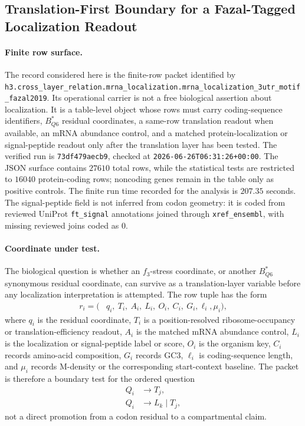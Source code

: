 \subsection{Translation-First Boundary for a Fazal-Tagged Localization Readout}\label{subsec:bioreality-q6-f3-stress-translation-first-localization}

\paragraph{Finite row surface.}
The record considered here is the finite-row packet identified by \texttt{h3.cross\_layer\_relation.mrna\_localization.mrna\_localization\_3utr\_motif\_fazal2019}.  Its operational carrier is not a free biological assertion about localization.  It is a table-level object whose rows must carry coding-sequence identifiers, $B^{*}_{Q6}$ residual coordinates, a same-row translation readout when available, an mRNA abundance control, and a matched protein-localization or signal-peptide readout only after the translation layer has been tested.  The verified run is \texttt{73df479aecb9}, checked at \texttt{2026-06-26T06:31:26+00:00}.  The JSON surface contains $27610$ total rows, while the statistical tests are restricted to $16040$ protein-coding rows; noncoding genes remain in the table only as positive controls.  The finite run time recorded for the analysis is $207.35$ seconds.  The signal-peptide field is not inferred from codon geometry: it is coded from reviewed UniProt \texttt{ft\_signal} annotations joined through \texttt{xref\_ensembl}, with missing reviewed joins coded as $0$.

\paragraph{Coordinate under test.}
The biological question is whether an $f_3$-stress coordinate, or another $B^{*}_{Q6}$ synonymous residual coordinate, can survive as a translation-layer variable before any localization interpretation is attempted.  The row tuple has the form
$$
\begin{aligned}
  r_i = (&q_i,\ T_i,\ A_i,\ L_i,\ O_i,\ C_i,\ G_i,\ell_i,\mu_i),
\end{aligned}
$$
where $q_i$ is the residual coordinate, $T_i$ is a position-resolved ribosome-occupancy or translation-efficiency readout, $A_i$ is the matched mRNA abundance control, $L_i$ is the localization or signal-peptide label or score, $O_i$ is the organism key, $C_i$ records amino-acid composition, $G_i$ records GC3, $\ell_i$ is coding-sequence length, and $\mu_i$ records M-density or the corresponding start-context baseline.  The packet is therefore a boundary test for the ordered question
$$
\begin{aligned}
  Q_i &\longrightarrow T_j,\\
  Q_i &\longrightarrow L_k \mid T_j,
\end{aligned}
$$
not a direct promotion from a codon residual to a compartmental claim.

